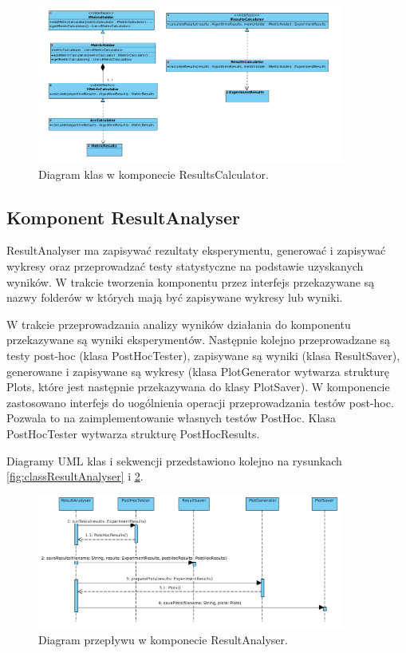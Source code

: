 \documentclass[12pt]{article}
\begin{document}
\begin{figure}[!h]
\centering
	\includegraphics[width=0.9\textwidth]{img/class_diagrams/results_calc.png}
	\caption{Diagram klas w komponecie ResultsCalculator.}
	\label{fig:classResultsCalculator}
\end{figure}

\subsection{Komponent ResultAnalyser}

ResultAnalyser ma zapisywać rezultaty eksperymentu, generować i zapisywać wykresy oraz przeprowadzać testy statystyczne na podstawie uzyskanych wyników. W trakcie tworzenia komponentu przez interfejs przekazywane są nazwy folderów w których mają być zapisywane wykresy lub wyniki. 

W trakcie przeprowadzania analizy wyników działania do komponentu przekazywane są wyniki eksperymentów. Następnie kolejno przeprowadzane są testy post-hoc (klasa PostHocTester), zapisywane są wyniki (klasa ResultSaver), generowane i zapisywane są wykresy (klasa PlotGenerator wytwarza strukturę Plots, które jest następnie przekazywana do klasy PlotSaver). W komponencie zastosowano interfejs do uogólnienia operacji przeprowadzania testów post-hoc. Pozwala to na zaimplementowanie własnych testów PostHoc. Klasa PostHocTester wytwarza strukturę PostHocResults.


Diagramy UML klas i sekwencji przedstawiono kolejno na rysunkach \ref{fig:classResultAnalyser} i \ref{fig:sequenceResultAnalyser}.

\begin{figure}[!h]
	\centering
	\includegraphics[width=0.9\textwidth]{img/sequenceResultAnalyser.png}
	\caption{Diagram przepływu w komponecie ResultAnalyser.}
	\label{fig:sequenceResultAnalyser}
\end{figure}
\end{document}
